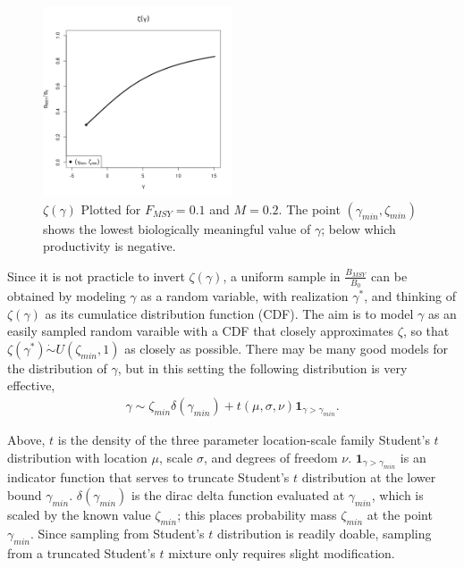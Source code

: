 \documentclass[12pt]{article}
\begin{document}
%
\clearpage


%
\begin{figure}
\vspace*{-1cm}
\includegraphics[width=0.5\textwidth]{../gpBias/zeta.png}
\vspace*{-1.3cm}
\caption{$\zeta(\gamma)$ Plotted for $F_{MSY}=0.1$ and $M=0.2$. The point 
$(\gamma_{min}, \zeta_{min})$ shows the lowest biologically meaningful 
value of $\gamma$; below which productivity is negative.}
\end{figure}

%
Since it is not practicle to invert $\zeta(\gamma)$, a uniform sample in 
$\frac{B_{MSY}}{B_0}$ can be obtained by modeling $\gamma$ as a random 
variable, with realization $\gamma^*$, and thinking of $\zeta(\gamma)$ as its 
cumulatice distribution function (CDF). The aim is to model $\gamma$ as an 
easily sampled random varaible with a CDF that closely approximates $\zeta$, so 
that $\zeta(\gamma^*)\dot\sim U(\zeta_{min},1)$ as closely as possible. There 
may be many good models for the distribution of $\gamma$, but in this setting 
the following distribution is very effective,
%
\begin{align}
\gamma \sim \zeta_{min}\delta(\gamma_{min}) + t(\mu, \sigma, \nu)\bm{1}_{\gamma>\gamma_{min}}. \label{mixT}
\end{align}
 
%
Above, $t$ is the density of the three parameter location-scale family Student's $t$ 
distribution with location $\mu$, scale $\sigma$, and degrees of freedom $\nu$. 
$\bm{1}_{\gamma>\gamma_{min}}$ is an indicator function that serves to truncate 
Student's $t$ distribution at the lower bound $\gamma_{min}$. 
$\delta(\gamma_{min})$ is the dirac delta function evaluated at $\gamma_{min}$, 
which is scaled by the known value $\zeta_{min}$; this places probability mass 
$\zeta_{min}$ at the point $\gamma_{min}$. Since sampling from Student's $t$ 
distribution is readily doable, sampling from a truncated Student's $t$ mixture 
only requires slight modification. 
\end{document}
